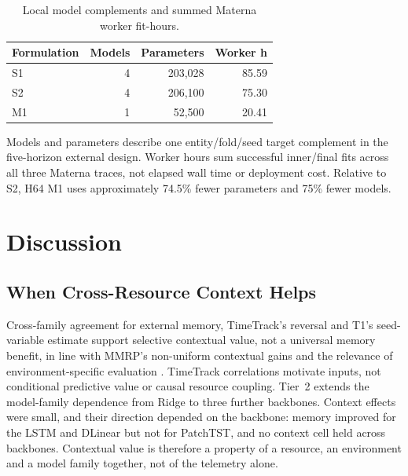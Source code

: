 \documentclass[5p,twocolumn]{elsarticle}
\begin{document}
\begin{table}[t]
  \caption{Local model complements and summed Materna worker fit-hours.}
  \label{tab:efficiency}
  \centering
  \small
  \begin{tabular}{@{}lrrr@{}}
    \toprule
    Formulation & Models & Parameters & Worker h \\
    \midrule
    S1 & 4 & 203,028 & 85.59 \\
    S2 & 4 & 206,100 & 75.30 \\
    M1 & 1 &  52,500 & 20.41 \\
    \bottomrule
  \end{tabular}

  \vspace{2pt}
  \parbox{\columnwidth}{\footnotesize Models and parameters describe one
  entity/fold/seed target complement in the five-horizon external design.
  Worker hours sum successful inner/final fits across all three Materna
  traces, not elapsed wall time or deployment cost. Relative to S2, H64 M1
  uses approximately 74.5\% fewer parameters and 75\% fewer models.}
\end{table}

\section{Discussion}
\label{sec:discussion}

\subsection{When Cross-Resource Context Helps}
\label{sec:discussion-context}

Cross-family agreement for external memory, TimeTrack's reversal and T1's
seed-variable estimate support selective contextual value, not a universal
memory benefit, in line with MMRP's non-uniform contextual gains
\citep{Tripathi2025MMRP} and the relevance of environment-specific evaluation
\citep{Rossi2025CloudUncertainty}. TimeTrack correlations
\citep{Meliani2025TimeTrack} motivate inputs, not conditional predictive value
or causal resource coupling.
Tier~2 extends the model-family dependence from Ridge to three further
backbones. Context effects were small, and their direction depended on the
backbone: memory improved for the LSTM and DLinear but not for PatchTST, and
no context cell held across backbones. Contextual value is therefore a
property of a resource, an environment and a model family together, not of
the telemetry alone.
\end{document}
